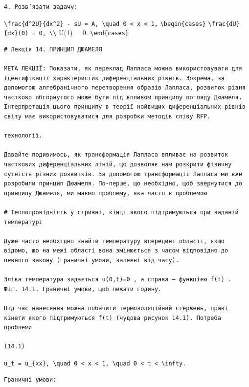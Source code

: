 \documentclass[
  ukrainian,
]{article}
\begin{document}
\begin{verbatim}
4. Розв’язати задачу:
\end{verbatim}

\texttt{\textbackslash{}frac\{d\^{}2U\}\{dx\^{}2\}\ -\ sU\ =\ A,\ \textbackslash{}quad\ 0\ \textless{}\ x\ \textless{}\ 1,}
\texttt{\textbackslash{}begin\{cases\}}
\texttt{\textbackslash{}frac\{dU\}\{dx\}(0)\ =\ 0,\ \textbackslash{}\textbackslash{}}
U(1) = 0. \texttt{\textbackslash{}end\{cases\}}

\begin{verbatim}
# Лекція 14. ПРИНЦИП ДЮАМЕЛЯ

МЕТА ЛЕКЦІЇ: Показати, як переклад Лапласа можна використовувати для ідентифікації характеристик диференціальних рівнів. Зокрема, за допомогою алгебранічного перетворення образів Лапласа, розвиток рівня частково обгорнутого може бути під впливом принципу погляду Дюамеля. Інтерпретація цього принципу в теорії найвищих диференціальних рівнів світу має використовуватися для розробки методів співу RFP.

технології.

Давайте подивимось, як трансформація Лапласа впливає на розвиток часткових диференціальних ліній, що дозволяє нам розкрити фізичну сутність різних розвитків. За допомогою трансформації Лапласа ми вже розробили принцип Дюамеля. По-перше, що необхідно, щоб звернутися до принципу Дюамеля, ми маємо проблему, яка часто є проблемою

# Теплопровідність у стрижні, кінці якого підтримуються при заданій температурі

Дуже часто необхідно знайти температуру всередині області, якщо відомо, що на межі області вона змінюється з часом відповідно до певного закону (граничні умови, залежні від часу).

Зліва температура задається u(0,t)=0 , а справа — функцією f(t) .
Фіг. 14.1. Граничні умови, щоб лежати годину.

Під час нанесення можна побачити термозоляційний стержень, праві кінети якого підтримуються f(t) (чудова рисунок 14.1). Потреба проблеми

(14.1)
\end{verbatim}

\texttt{u\_t\ =\ u\_\{xx\},\ \textbackslash{}quad\ 0\ \textless{}\ x\ \textless{}\ 1,\ \textbackslash{}quad\ 0\ \textless{}\ t\ \textless{}\ \textbackslash{}infty.}

\begin{verbatim}
Граничні умови:
\end{verbatim}
\end{document}
